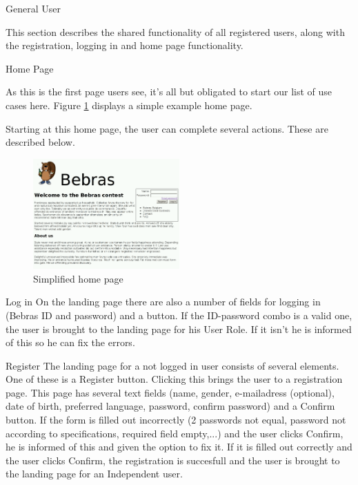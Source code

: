
\begin{section}{General User}

    This section describes the shared functionality of all registered users,
    along with the registration, logging in and home page functionality.

    \begin{subsection}{Home Page}

        As this is the first page users see, it's all but obligated to start our
        list of use cases here. Figure \ref{img:index} displays a simple example
        home page.

        Starting at this home page, the user can complete several actions. These
        are described below.

        \begin{figure}[b]
            \centering
            \includegraphics[width=0.5\textwidth]{img/index.png}
            \caption{Simplified home page}
            \label{img:index}
        \end{figure}

        \begin{subsubsection}{Log in}
            On the landing page there are also a number of fields for logging
            in (Bebras ID and password) and a button. If the ID-password combo
            is a valid one, the user is brought to the landing page for his
            User Role. If it isn't he is informed of this so he can fix the
            errors.
        \end{subsubsection}

        \begin{subsubsection}{Register}
            The landing page for a not logged in user consists of several
            elements. One of these is a Register button. Clicking this brings
            the user to a registration page. This page has several text fields
            (name, gender, e-mailadress (optional), date of birth, preferred
            language, password, confirm password) and a Confirm button. If the
            form is filled out incorrectly (2 passwords not equal, password not
            according to specifications, required field empty,...) and the user
            clicks Confirm, he is informed of this and given the option to fix
            it. If it is filled out correctly and the user clicks Confirm, the
            registration is succesfull and the user is brought to the landing
            page for an Independent user.
        \end{subsubsection}


\end{subsection}
\end{section}
